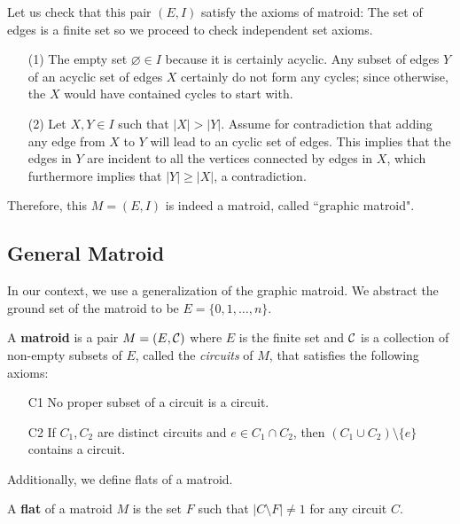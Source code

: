         Let us check that this pair $(E, I)$ satisfy the axioms of matroid:
        The set of edges is a finite set so we proceed to check independent set axioms.
        \begin{enumerate}
    	    \item[(1)]
		    The empty set $\varnothing \in I$ because it is certainly acyclic. 
		    Any subset of edges $Y$ of an acyclic set of edges $X$ certainly do not form any cycles;
		    since otherwise, the $X$ would have contained cycles to start with. 
	        
	        \item[(2)]
		    Let $X, Y \in I$ such that $|X| > |Y|$.
		    Assume for contradiction that adding any edge from $X$ to $Y$ 
		    will lead to an cyclic set of edges. 
		    This implies that the edges in $Y$ are incident to all the vertices 
		    connected by edges in $X$,
		    which furthermore implies that $|Y| \ge |X|$, a contradiction.
        \end{enumerate}
        Therefore, this $M = (E, I)$ is indeed a matroid, called ``graphic matroid".
	
	
	\subsection{General Matroid}
	\label{subsec:general-matroid}
	    In our context, we use a generalization of the graphic matroid.
    	We abstract the ground set of the matroid to be 
	    $E = \{0, 1, \ldots, n\}$.
		\begin{definition}[Matroid]
			A \textbf{matroid} is a pair $M = (E, \mathcal{C})$ 
			where $E$ is the finite set and 
			$\mathcal{C}$ is a collection of non-empty subsets of $E$,
			called the \emph{circuits} of $M$,
			that satisfies the following axioms:
				\begin{enumerate}
					\item[C1]
					    No proper subset of a circuit is a circuit.
					
					\item[C2]
						If $C_1, C_2$ are distinct circuits
						and $e \in C_1 \cap C_2$,
						then $(C_1 \cup C_2)\setminus \{e\}$
						contains a circuit.
				\end{enumerate}
		\end{definition}
		
		Additionally,
		we define flats of a matroid.
		\begin{definition}[Flat]
		\label{def:flat-of-a-matroid}
		    A \textbf{flat} of a matroid $M$ 
		    is the set $F$ such that $|C \setminus F| \ne 1$ 
		    for any circuit $C$. 
	    \end{definition}
	    
